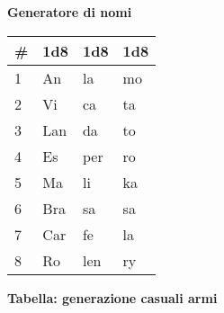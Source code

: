 {{\begin{multicols}{2}
\medskip

\textbf{Generatore di nomi}

\begin{tabular}{llll}
	\toprule
	\# & 1d8 & 1d8&1d8 \\
	\toprule
	1&An & la & mo\\
	2&Vi & ca & ta\\
	3&Lan & da & to\\
	4&Es & per & ro\\
	5&Ma & li & ka\\
	6&Bra & sa & sa\\
	7&Car & fe & la\\
	8&Ro & len & ry
\end{tabular}

\end{multicols}

\textbf{Tabella: generazione casuali armi}

\medskip

}}
